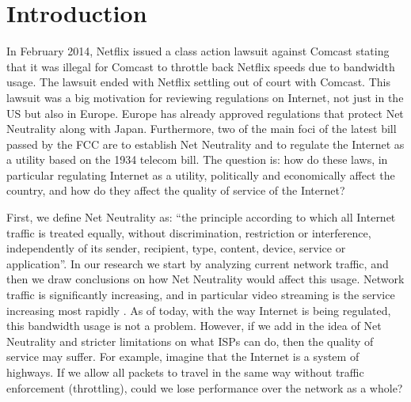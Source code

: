 \documentclass{sigcomm-alternate}
\begin{document}
\section{Introduction}
In February 2014, Netflix issued a class action lawsuit against Comcast stating that it was illegal for Comcast to throttle back Netflix speeds due to bandwidth usage. The lawsuit ended with Netflix settling out of court with Comcast. This lawsuit was a big motivation for reviewing regulations on Internet, not just in the US but also in Europe. Europe has already approved regulations that protect Net Neutrality along with Japan. Furthermore, two of the main foci of the latest bill passed by the FCC are to establish Net Neutrality and to regulate the Internet as a utility based on the 1934 telecom bill. The question is: how do these laws, in particular regulating Internet as a utility, politically and economically affect the country, and how do they affect the quality of service of the Internet?

First, we define Net Neutrality as: “the principle according to which all Internet traffic is treated equally, without discrimination, restriction or interference, independently of its sender, recipient, type, content, device, service or application”\cite{gigaom}. In our research we start by analyzing current network traffic, and then we draw conclusions on how Net Neutrality would affect this usage. Network traffic is significantly increasing, and in particular video streaming is the service increasing most rapidly \cite{cisco}. As of today, with the way Internet is being regulated, this bandwidth usage is not a problem. However, if we add in the idea of Net Neutrality and stricter limitations on what ISPs can do, then the quality of service may suffer.  For example, imagine that the Internet is a system of highways. If we allow all packets to travel in the same way without traffic enforcement (throttling), could we lose performance over the network as a whole? \cite{tandlInfographic}
\end{document}
